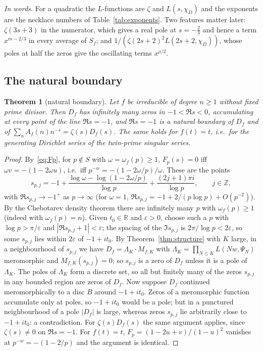\documentclass[11pt,a4paper]{article}
\newtheorem{theorem}{Theorem}
\theoremstyle{remark}\newtheorem{remark}[theorem]{Remark}
\newcommand{\Z}{\mathbb{Z}}\newcommand{\Q}{\mathbb{Q}}\newcommand{\F}{\mathbb{F}}\newcommand{\C}{\mathbb{C}}
\begin{document}
\emph{In words.} For a quadratic the $L$-functions are $\zeta$ and $L(s,\chi_D)$ and the exponents are
the necklace numbers of Table~\ref{tab:exponents}. Two features matter later: $\zeta(3s+3)$ in the numerator,
which gives a real pole at $s=-\tfrac23$ and hence a term $x^{m-2/3}$ in every average of $S_f$; and
$1/(\zeta(2s+2)^2L(2s+2,\chi_D))$, whose poles at half the zeros give the oscillating terms $x^{\rho/2}$.

\subsection{The natural boundary}

\begin{theorem}[natural boundary]\label{thm:boundary}
Let $f$ be irreducible of degree $n\ge1$ without fixed prime divisor. Then $D_f$ has infinitely many zeros
in $-1<\Re s<0$, accumulating at every point of the line $\Re s=-1$, and $\Re s=-1$ is a natural boundary
of $D_f$ and of $\sum_nA_f(n)n^{-s}=\zeta(s)D_f(s)$. The same holds for $f(t)=t$, i.e.\ for the
generating Dirichlet series of the twin-prime singular series.
\end{theorem}
\begin{proof}
By~\eqref{eq:Fp}, for $p\notin S$ with $\omega=\omega_f(p)\ge1$, $F_p(s)=0$ iff $\omega v=-(1-2\omega u)$, i.e.\
iff $p^{-w}=-(1-2\omega/p)/\omega$. These are the points
\[
s_{p,j}=-1+\frac{\log\omega-\log(1-2\omega/p)}{\log p}+\frac{(2j+1)\pi i}{\log p},\qquad j\in\Z,
\]
with $\Re s_{p,j}\to-1^+$ as $p\to\infty$ (for $\omega=1$, $\Re s_{p,j}=-1+2/(p\log p)+O(p^{-2})$). By the
Chebotarev density theorem there are infinitely many $p$ with $\omega_f(p)\ge1$ (indeed with
$\omega_f(p)=n$). Given $t_0\in\mathbb R$ and $\varepsilon>0$, choose such a $p$ with $\log p>\pi/\varepsilon$
and $|\Re s_{p,j}+1|<\varepsilon$; the spacing of the $\Im s_{p,j}$ is $2\pi/\log p<2\varepsilon$, so some
$s_{p,j}$ lies within $2\varepsilon$ of $-1+it_0$. By Theorem~\ref{thm:structure} with $K$ large, in a
neighbourhood of $s_{p,j}$ we have $D_f=\Lambda_K\cdot M_{f,K}$ with $\Lambda_K=\prod_{N\le K}L(Nw,\Psi_N)$
meromorphic and $M_{f,K}(s_{p,j})=0$; so $s_{p,j}$ is a zero of $D_f$ unless it is a pole of $\Lambda_K$.
The poles of $\Lambda_K$ form a discrete set, so all but finitely many of the zeros $s_{p,j}$ in any bounded
region are zeros of $D_f$. Now suppose $D_f$ continued meromorphically to a disc $B$ around $-1+it_0$.
Zeros of a meromorphic function accumulate only at poles, so $-1+it_0$ would be a pole; but in a
punctured neighbourhood of a pole $|D_f|$ is large, whereas zeros $s_{p,j}$ lie arbitrarily close to
$-1+it_0$: a contradiction. For $\zeta(s)D_f(s)$ the same argument applies, since $\zeta(s)\ne0$ on $\Re s=-1$. For $f(t)=t$, $F_p=(1-2u+v)/(1-u)^2$ vanishes at $p^{-w}=-(1-2/p)$ and the argument is
identical.
\end{proof}
\end{document}
